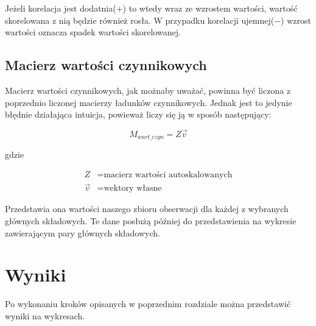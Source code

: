 \documentclass[12pt, a4paper]{article}
\begin{document}
        Jeżeli korelacja jest dodatnia($+$) to wtedy wraz ze wzrostem wartości, wartość skorelowana z nią będzie również rosła.
        W przypadku korelacji ujemnej($-$) wzrost wartości oznacza spadek wartości skorelowanej.
            

    \subsection{Macierz wartości czynnikowych}
        
        Macierz wartości czynnikowych, jak możnaby uważać, powinna być liczona z poprzednio liczonej macierzy ładunków czynnikowych.
        Jednak jest to jedynie błędnie działająca intuicja, powieważ liczy się ją w sposób następujący:

        \begin{equation}
            M_{wart\_czyn} = Z \overrightarrow{v}
        \end{equation}

        gdzie

        \begin{align*}
            Z &= \text{macierz wartości autoskalowanych}\\
            \overrightarrow{v} &= \text{wektory własne}
        \end{align*}

        Przedstawia ona wartości naszego zbioru obserwacji dla każdej z wybranych głównych składowych. Te dane posłużą później do
        przedstawienia na wykresie zawierającym pary głównych składowych.

\section{Wyniki}

    Po wykonaniu kroków opisanych w poprzednim rozdziale można przedstawić wyniki na wykresach.     
\end{document}
